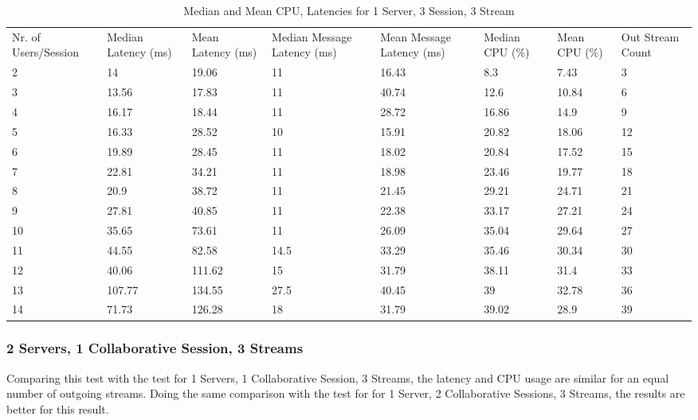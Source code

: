 \begin{table}
\caption{Median and Mean CPU, Latencies for 1 Server, 3 Session, 3 Stream}
\label{table:1serv_3sess_3str}
\begin{tabu} to\linewidth{|X[c]|X[c]|X[c]|X[c]|X[c]|X[c]|X[c]|X[c]|}
\everyrow{\hline}
\hline
Nr. of Users/Session & Median Latency (ms) & Mean Latency (ms) & Median Message Latency (ms) & Mean Message Latency (ms) & Median CPU (\%) & Mean CPU (\%) & Out Stream Count\\
2 & 14 & 19.06 & 11 & 16.43 & 8.3 & 7.43 & 3 \\
3 & 13.56 & 17.83 & 11 & 40.74 & 12.6 & 10.84 & 6 \\
4 & 16.17 & 18.44 & 11 & 28.72 & 16.86 & 14.9 & 9 \\
5 & 16.33 & 28.52 & 10 & 15.91 & 20.82 & 18.06 & 12 \\
6 & 19.89 & 28.45 & 11 & 18.02 & 20.84 & 17.52 & 15 \\
7 & 22.81 & 34.21 & 11 & 18.98 & 23.46 & 19.77 & 18 \\
8 & 20.9 & 38.72 & 11 & 21.45 & 29.21 & 24.71 & 21 \\
9 & 27.81 & 40.85 & 11 & 22.38 & 33.17 & 27.21 & 24 \\
10 & 35.65 & 73.61 & 11 & 26.09 & 35.04 & 29.64 & 27 \\
11 & 44.55 & 82.58 & 14.5 & 33.29 & 35.46 & 30.34 & 30 \\
12 & 40.06 & 111.62 & 15 & 31.79 & 38.11 & 31.4 & 33 \\
13 & 107.77 & 134.55 & 27.5 & 40.45 & 39 & 32.78 & 36 \\
14 & 71.73 & 126.28 & 18 & 31.79 & 39.02 & 28.9 & 39 \\
\end{tabu}
\end{table}

\subsubsection{2 Servers, 1 Collaborative Session, 3 Streams}

Comparing this test with the test for 1 Servers, 1 Collaborative Session, 3 Streams, the latency and CPU usage are similar for an equal number of outgoing streams. Doing the same comparison with the test for for 1 Server, 2 Collaborative Sessions, 3 Streams, the results are better for this result.

